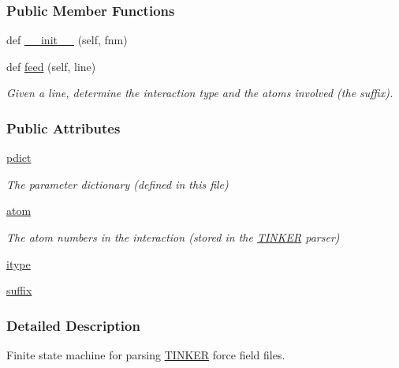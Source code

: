 \subsubsection*{Public Member Functions}
\begin{DoxyCompactItemize}
\item 
def \hyperlink{classsrc_1_1tinkerio_1_1Tinker__Reader_a0b8cd6b8396f92db9e389f61a692e984}{\+\_\+\+\_\+init\+\_\+\+\_\+} (self, fnm)
\item 
def \hyperlink{classsrc_1_1tinkerio_1_1Tinker__Reader_a456a3fad03449282241abbea4a866a42}{feed} (self, line)
\begin{DoxyCompactList}\small\item\em Given a line, determine the interaction type and the atoms involved (the suffix). \end{DoxyCompactList}\end{DoxyCompactItemize}
\subsubsection*{Public Attributes}
\begin{DoxyCompactItemize}
\item 
\hyperlink{classsrc_1_1tinkerio_1_1Tinker__Reader_a4c305cce11cc0a46afafaeffcd5aff08}{pdict}
\begin{DoxyCompactList}\small\item\em The parameter dictionary (defined in this file) \end{DoxyCompactList}\item 
\hyperlink{classsrc_1_1tinkerio_1_1Tinker__Reader_a35bc6d08ba78332cb55415646373893a}{atom}
\begin{DoxyCompactList}\small\item\em The atom numbers in the interaction (stored in the \hyperlink{classsrc_1_1tinkerio_1_1TINKER}{T\+I\+N\+K\+ER} parser) \end{DoxyCompactList}\item 
\hyperlink{classsrc_1_1tinkerio_1_1Tinker__Reader_a6d94f65ac2cb4240a9bacac8c01467c8}{itype}
\item 
\hyperlink{classsrc_1_1tinkerio_1_1Tinker__Reader_ad98ef38ba4d380e5e94abd71773a611c}{suffix}
\end{DoxyCompactItemize}


\subsubsection{Detailed Description}
Finite state machine for parsing \hyperlink{classsrc_1_1tinkerio_1_1TINKER}{T\+I\+N\+K\+ER} force field files. 


